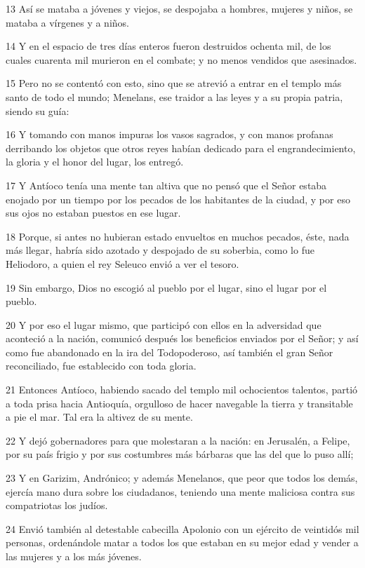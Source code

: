 \par 13 Así se mataba a jóvenes y viejos, se despojaba a hombres, mujeres y niños, se mataba a vírgenes y a niños.
\par 14 Y en el espacio de tres días enteros fueron destruidos ochenta mil, de los cuales cuarenta mil murieron en el combate; y no menos vendidos que asesinados.
\par 15 Pero no se contentó con esto, sino que se atrevió a entrar en el templo más santo de todo el mundo; Menelans, ese traidor a las leyes y a su propia patria, siendo su guía:
\par 16 Y tomando con manos impuras los vasos sagrados, y con manos profanas derribando los objetos que otros reyes habían dedicado para el engrandecimiento, la gloria y el honor del lugar, los entregó.
\par 17 Y Antíoco tenía una mente tan altiva que no pensó que el Señor estaba enojado por un tiempo por los pecados de los habitantes de la ciudad, y por eso sus ojos no estaban puestos en ese lugar.
\par 18 Porque, si antes no hubieran estado envueltos en muchos pecados, éste, nada más llegar, habría sido azotado y despojado de su soberbia, como lo fue Heliodoro, a quien el rey Seleuco envió a ver el tesoro.
\par 19 Sin embargo, Dios no escogió al pueblo por el lugar, sino el lugar por el pueblo.
\par 20 Y por eso el lugar mismo, que participó con ellos en la adversidad que aconteció a la nación, comunicó después los beneficios enviados por el Señor; y así como fue abandonado en la ira del Todopoderoso, así también el gran Señor reconciliado, fue establecido con toda gloria.
\par 21 Entonces Antíoco, habiendo sacado del templo mil ochocientos talentos, partió a toda prisa hacia Antioquía, orgulloso de hacer navegable la tierra y transitable a pie el mar. Tal era la altivez de su mente.
\par 22 Y dejó gobernadores para que molestaran a la nación: en Jerusalén, a Felipe, por su país frigio y por sus costumbres más bárbaras que las del que lo puso allí;
\par 23 Y en Garizim, Andrónico; y además Menelanos, que peor que todos los demás, ejercía mano dura sobre los ciudadanos, teniendo una mente maliciosa contra sus compatriotas los judíos.
\par 24 Envió también al detestable cabecilla Apolonio con un ejército de veintidós mil personas, ordenándole matar a todos los que estaban en su mejor edad y vender a las mujeres y a los más jóvenes.

